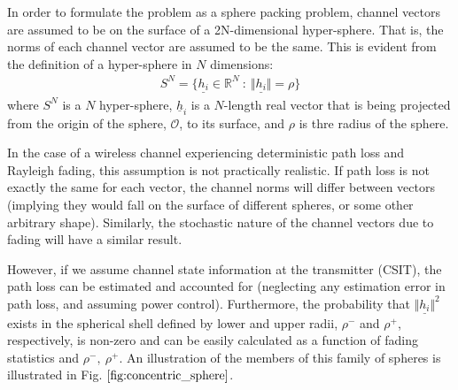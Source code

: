 In order to formulate the problem as a sphere packing problem, channel vectors are assumed to be on the surface of a 2N-dimensional hyper-sphere. That is, the norms of each channel vector are assumed to be the same. This is evident from the definition of a hyper-sphere in $N$ dimensions:
\begin{equation}\label{eq:sphere_def}
    \begin{aligned}
        S^{N} = \lbrace \underline{h_i} \in \mathbb{R}^N \ : \ \Vert \underline{h_i} \Vert = \rho \rbrace
    \end{aligned}
\end{equation}
where $S^{N}$ is a $N$ hyper-sphere, $\underline{h}_i$ is a $N$-length real vector that is being projected from the origin of the sphere, $\mathcal{O}$, to its surface, and $\rho$ is thre radius of the sphere.

In the case of a wireless channel experiencing deterministic path loss and Rayleigh fading, this assumption is not practically realistic. If path loss is not exactly the same for each vector, the channel norms will differ between vectors (implying they would fall on the surface of different spheres, or some other arbitrary shape). Similarly, the stochastic nature of the channel vectors due to fading will have a similar result.

However, if we assume channel state information at the transmitter (CSIT), the path loss can be estimated and accounted for (neglecting any estimation error in path loss, and assuming power control). Furthermore, the probability that $\Vert \underline{h_i} \Vert^2$ exists in the spherical shell defined by lower and upper radii, $\rho^-$ and $\rho^+$, respectively, is non-zero and can be easily calculated as a function of fading statistics and $\rho^-,\ \rho^+ $. An illustration of the members of this family of spheres is illustrated in Fig. $\ref{fig:concentric_sphere}$.

